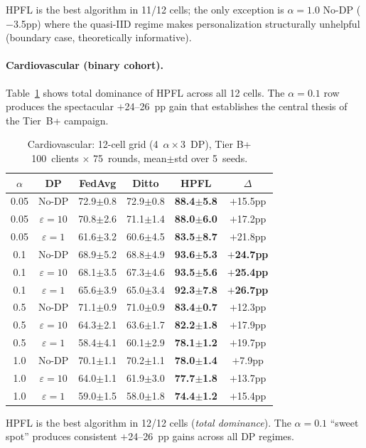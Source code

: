 \documentclass[conference]{IEEEtran}
\begin{document}
\begin{table}[htbp]
\vspace{1mm}
\footnotesize{HPFL is the best algorithm in 11/12 cells; the only exception is $\alpha{=}1.0$ No-DP ($-$3.5pp) where the quasi-IID regime makes personalization structurally unhelpful (boundary case, theoretically informative).}
\end{table}

\paragraph{Cardiovascular (binary cohort).} Table~\ref{tab:tier_b_hpfl_cv} shows total dominance of HPFL across all 12 cells. The $\alpha{=}0.1$ row produces the spectacular $+$24--26~pp gain that establishes the central thesis of the Tier~B+ campaign.

\begin{table}[htbp]
\centering
\caption{Cardiovascular: 12-cell grid (4~$\alpha\times 3$~DP), Tier B+ 100~clients $\times$ 75~rounds, mean$\pm$std over 5~seeds.}
\label{tab:tier_b_hpfl_cv}
\small
\setlength{\tabcolsep}{4pt}
\begin{tabular}{cccccc}
\toprule
\textbf{$\alpha$} & \textbf{DP} & \textbf{FedAvg} & \textbf{Ditto} & \textbf{HPFL} & \textbf{$\Delta$} \\
\midrule
0.05 & No-DP & 72.9$\pm$0.8 & 72.9$\pm$0.8 & \textbf{88.4$\pm$5.8} & $+$15.5pp \\
0.05 & $\varepsilon{=}10$ & 70.8$\pm$2.6 & 71.1$\pm$1.4 & \textbf{88.0$\pm$6.0} & $+$17.2pp \\
0.05 & $\varepsilon{=}1$ & 61.6$\pm$3.2 & 60.6$\pm$4.5 & \textbf{83.5$\pm$8.7} & $+$21.8pp \\
0.1 & No-DP & 68.9$\pm$5.2 & 68.8$\pm$4.9 & \textbf{93.6$\pm$5.3} & \textbf{$+$24.7pp} \\
0.1 & $\varepsilon{=}10$ & 68.1$\pm$3.5 & 67.3$\pm$4.6 & \textbf{93.5$\pm$5.6} & \textbf{$+$25.4pp} \\
0.1 & $\varepsilon{=}1$ & 65.6$\pm$3.9 & 65.0$\pm$3.4 & \textbf{92.3$\pm$7.8} & \textbf{$+$26.7pp} \\
0.5 & No-DP & 71.1$\pm$0.9 & 71.0$\pm$0.9 & \textbf{83.4$\pm$0.7} & $+$12.3pp \\
0.5 & $\varepsilon{=}10$ & 64.3$\pm$2.1 & 63.6$\pm$1.7 & \textbf{82.2$\pm$1.8} & $+$17.9pp \\
0.5 & $\varepsilon{=}1$ & 58.4$\pm$4.1 & 60.1$\pm$2.9 & \textbf{78.1$\pm$1.2} & $+$19.7pp \\
1.0 & No-DP & 70.1$\pm$1.1 & 70.2$\pm$1.1 & \textbf{78.0$\pm$1.4} & $+$7.9pp \\
1.0 & $\varepsilon{=}10$ & 64.0$\pm$1.1 & 61.9$\pm$3.0 & \textbf{77.7$\pm$1.8} & $+$13.7pp \\
1.0 & $\varepsilon{=}1$ & 59.0$\pm$1.5 & 58.0$\pm$1.8 & \textbf{74.4$\pm$1.2} & $+$15.4pp \\
\bottomrule
\end{tabular}

\vspace{1mm}
\footnotesize{HPFL is the best algorithm in 12/12 cells (\emph{total dominance}). The $\alpha{=}0.1$ ``sweet spot'' produces consistent $+$24--26~pp gains across all DP regimes.}
\end{table}
\end{document}
